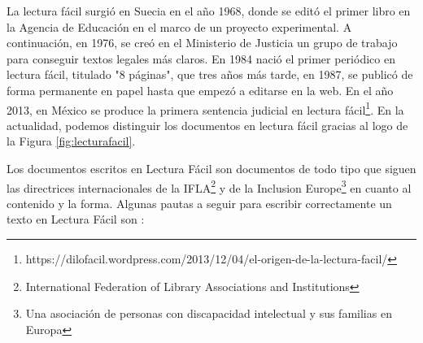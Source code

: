 La lectura fácil surgió en Suecia en el año 1968, donde se editó el primer libro en la Agencia de Educación en el marco de un proyecto experimental. A continuación, en 1976, se creó en el Ministerio de Justicia un grupo de trabajo para conseguir textos legales más claros.
En 1984 nació el primer periódico en lectura fácil, titulado "8 páginas", que tres años más tarde, en 1987, se publicó de forma permanente en papel hasta que empezó a editarse en la web. 
En el año 2013, en México se produce la primera sentencia judicial en lectura fácil\footnote{https://dilofacil.wordpress.com/2013/12/04/el-origen-de-la-lectura-facil/}. En la actualidad, podemos distinguir los documentos en lectura fácil gracias al logo de la Figura \ref{fig:lecturafacil}.

	
	
Los documentos escritos en Lectura Fácil \citep{wiki:lecturafacil} son documentos de todo tipo que siguen las directrices internacionales de la IFLA\footnote{International Federation of Library Associations and Institutions} y de la Inclusion Europe\footnote{Una asociación de personas con discapacidad intelectual y sus familias en Europa} en cuanto al contenido y la forma.
Algunas pautas a seguir para escribir correctamente un texto en Lectura Fácil son \citep{GarciaMunoz2012LecturaFacil}:


